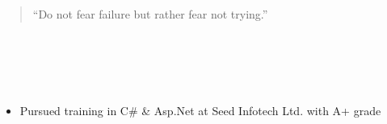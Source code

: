 \documentclass[10pt,a4paper,ragged2e,withhyper]{altacv}
\begin{document}
\begin{paracol}{2}






\switchcolumn

\begin{quote}
``Do not fear failure but rather fear not trying.''
\end{quote}

\\
\\


\\



\begin{itemize}
    \item {Pursued training in C\# \& Asp.Net at Seed Infotech Ltd. with A+ grade}
\end{itemize}












\end{paracol}
\end{document}
